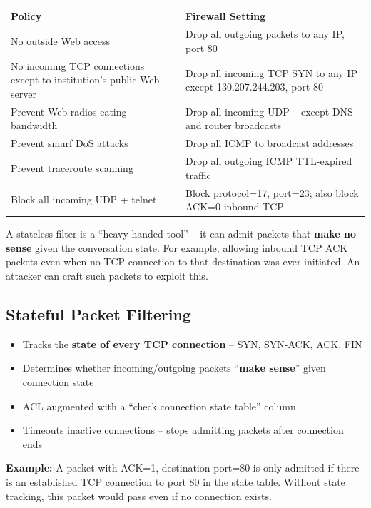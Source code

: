 \begin{tcolorbox}[formulabox, title=ACL Examples -- Policy to Firewall Setting]
\begin{tabular}{p{5.5cm}p{6.5cm}}
\toprule
\textbf{Policy} & \textbf{Firewall Setting} \\
\midrule
No outside Web access & Drop all outgoing packets to any IP, port 80 \\
No incoming TCP connections except to institution's public Web server & Drop all incoming TCP SYN to any IP except 130.207.244.203, port 80 \\
Prevent Web-radios eating bandwidth & Drop all incoming UDP -- except DNS and router broadcasts \\
Prevent smurf DoS attacks & Drop all ICMP to broadcast addresses \\
Prevent traceroute scanning & Drop all outgoing ICMP TTL-expired traffic \\
Block all incoming UDP + telnet & Block protocol=17, port=23; also block ACK=0 inbound TCP \\
\bottomrule
\end{tabular}
\end{tcolorbox}

\begin{tcolorbox}[warnbox, title=Stateless Packet Filter Weakness]
A stateless filter is a ``heavy-handed tool'' -- it can admit packets that \textbf{make no sense} given the conversation state. For example, allowing inbound TCP ACK packets even when no TCP connection to that destination was ever initiated. An attacker can craft such packets to exploit this.
\end{tcolorbox}

\subsection{Stateful Packet Filtering}

\begin{tcolorbox}[keybox, title=Stateful Packet Filtering]
\begin{itemize}[noitemsep]
  \item Tracks the \textbf{state of every TCP connection} -- SYN, SYN-ACK, ACK, FIN
  \item Determines whether incoming/outgoing packets ``\textbf{make sense}'' given connection state
  \item ACL augmented with a ``check connection state table'' column
  \item Timeouts inactive connections -- stops admitting packets after connection ends
\end{itemize}
\textbf{Example:} A packet with ACK=1, destination port=80 is only admitted if there is an established TCP connection to port 80 in the state table. Without state tracking, this packet would pass even if no connection exists.
\end{tcolorbox}

